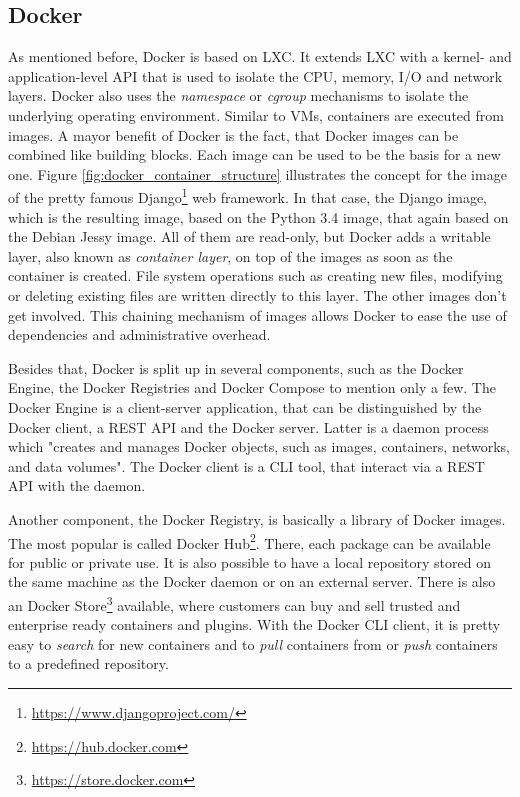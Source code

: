 \subsection{Docker}
As mentioned before, Docker is based on \ac{LXC}.
It extends \ac{LXC} with a kernel- and application-level API that is used to isolate the CPU, memory, I/O and network layers.\autocite[cf.][p. 82]{Bernstein:2014}
Docker also uses the \textit{namespace} or \textit{cgroup} mechanisms to isolate the underlying operating environment.\autocite[cf.][p. 82]{Bernstein:2014}
Similar to \acp{VM}, containers are executed from images.
A mayor benefit of Docker is the fact, that Docker images can be combined like building blocks.
Each image can be used to be the basis for a new one.
Figure \ref{fig:docker_container_structure} illustrates the concept for the image of the pretty famous Django\footnote{\url{https://www.djangoproject.com/}} web framework.
In that case, the Django image, which is the resulting image, based on the Python 3.4 image, that again based on the Debian Jessy image.
All of them are read-only, but Docker adds a writable layer, also known as \textit{container layer}, on top of the images as soon as the container is created.
File system operations such as creating new files, modifying or deleting existing files are written directly to this layer.\autocite[cf.]{dockerImages}
The other images don't get involved.
This chaining mechanism of images allows Docker to ease the use of dependencies and administrative overhead.

Besides that, Docker is split up in several components, such as the Docker Engine, the Docker Registries and Docker Compose to mention only a few.
The Docker Engine is a client-server application, that can be distinguished by the Docker client, a \ac{REST} \ac{API} and the Docker server.
Latter is a daemon process which "creates and manages Docker objects, such as images, containers, networks, and data volumes"\autocite{dockerEngine}.
The Docker client is a \ac{CLI} tool, that interact via a \ac{REST} \ac{API} with the daemon.\autocite[cf.]{dockerEngine}

Another component, the Docker Registry, is basically a library of Docker images.
The most popular is called Docker Hub\footnote{\url{https://hub.docker.com}}.
There, each package can be available for public or private use.
It is also possible to have a local repository stored on the same machine as the Docker daemon or on an external server.\autocite[cf.]{dockerEngine}
There is also an Docker Store\footnote{\url{https://store.docker.com}} available, where customers can buy and sell trusted and enterprise ready containers and plugins.
With the Docker \ac{CLI} client, it is pretty easy to \textit{search} for new containers and to \textit{pull} containers from or \textit{push} containers to a predefined repository.

